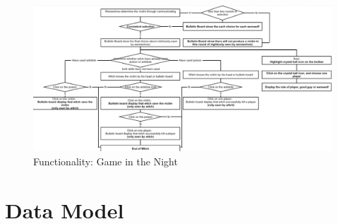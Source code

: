 \documentclass[11pt]{article}
\begin{document}
\begin{figure}
\centering
\includegraphics[width=0.9\linewidth, keepaspectratio]{func-gamenight.png}
\caption{Functionality: Game in the Night}
\label{fig:func-gamenight}
\end{figure}

\section{Data Model}




\end{document}

